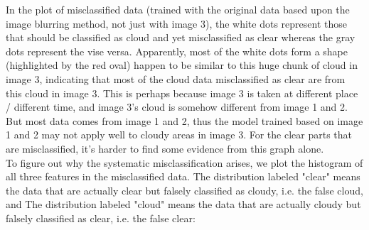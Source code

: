 \documentclass[jou]{apa}%
\begin{document}
In the plot of misclassified data (trained with the original data based upon the image blurring method, not just with image 3), the white dots represent those that should be classified as cloud and yet misclassified as clear whereas the gray dots represent the vise versa. Apparently, most of the white dots form a shape (highlighted by the red oval) happen to be similar to this huge chunk of cloud in image 3, indicating that most of the cloud data misclassified as clear are from this cloud in image 3. This is perhaps because image 3 is taken at different place / different time, and image 3's cloud is somehow different from image 1 and 2. But most data comes from image 1 and 2, thus the model trained based on image 1 and 2 may not apply well to cloudy areas in image 3. For the clear parts that are misclassified, it's harder to find some evidence from this graph alone.\\
\indent To figure out why the systematic misclassification arises, we plot the histogram of all three features in the misclassified data. The distribution labeled "clear" means the data that are actually clear but falsely classified as cloudy, i.e. the false cloud, and The distribution labeled "cloud" means the data that are actually cloudy but falsely classified as clear, i.e. the false clear: 

\end{document}
